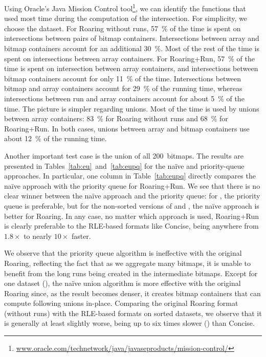 \documentclass[times]{speauth}
\begin{document}
Using Oracle's Java Mission Control tool\footnote{\url{www.oracle.com/technetwork/java/javaseproducts/mission-control/}}, we can identify the functions that used most time during the computation of the intersection. 
For simplicity, we choose the \CensInc{} dataset. For Roaring without runs, \SI{57}{\percent} of the time is spent on intersections between pairs of bitmap containers. Intersections between array and bitmap containers account for an additional 
\SI{30}{\percent}. Most of the rest of the time is spent on intersections between array containers. For Roaring+Run, \SI{57}{\percent} of the time is spent on intersection between array containers, and intersections between bitmap containers account for only \SI{11}{\percent} of the time. Intersections between bitmap and array containers account for \SI{29}{\percent} of the running time, whereas intersections between run and array containers account for about \SI{5}{\percent} of the time.
The picture is simpler regarding unions. Most of the time is used
by unions between array containers: \SI{83}{\percent} for Roaring without runs and \SI{68}{\percent} for Roaring+Run. In both cases, unions between array and bitmap containers use about \SI{12}{\percent} of the running time. 


Another important test case is the union of all 200~bitmaps. The results are presented in Tables~\ref{tab:eu}~and~\ref{tab:eupq}
for the na\"ive and priority-queue approaches.
In particular, one column in Table~\ref{tab:eupq} directly
compares the na\"ive approach with the priority queue for Roaring+Run.
We see that there is no clear winner between the  na\"ive approach and the priority queue: for \Wikileaks{}, the priority queue is preferable, but for the non-sorted versions of
\CensInc{} and \Censeighten{}, the  na\"ive approach is better for Roaring. In any case, no matter which approach is used, Roaring+Run
is clearly preferable to the RLE-based formats like Concise, being anywhere from $1.8\times$ to nearly $10\times$ faster.





We observe that the priority queue algorithm is ineffective with the original Roaring, reflecting the fact that as we aggregate many bitmaps, it is unable to benefit from the long runs being created in the intermediate bitmaps. Except for one dataset (\Censeightensrt{}), the na\"ive union algorithm is more effective with the original Roaring since, as the result becomes denser, it creates bitmap containers that can compute following unions in-place. Comparing the original Roaring format (without runs) with the RLE-based formats on sorted datasets, we observe that it is generally at least slightly worse, being up to six times slower (\Weathersrt) than Concise.
\end{document}
